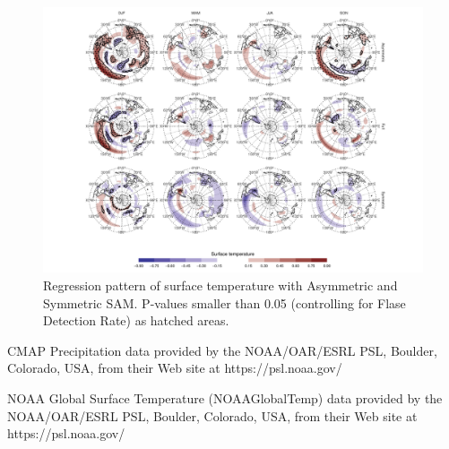 \documentclass[twocol]{ametsocV5}
\begin{document}
\begin{figure}
\includegraphics{regr-air-season-1} \caption[Regression pattern of surface temperature with Asymmetric and Symmetric SAM]{Regression pattern of surface temperature with Asymmetric and Symmetric SAM. P-values smaller than 0.05 (controlling for Flase Detection Rate) as hatched areas.}\label{fig:regr-air-season}
\end{figure}

\acknowledgments

CMAP Precipitation data provided by the NOAA/OAR/ESRL PSL, Boulder,
Colorado, USA, from their Web site at https://psl.noaa.gov/

NOAA Global Surface Temperature (NOAAGlobalTemp) data provided by the
NOAA/OAR/ESRL PSL, Boulder, Colorado, USA, from their Web site at
https://psl.noaa.gov/

\appendix

\end{document}
